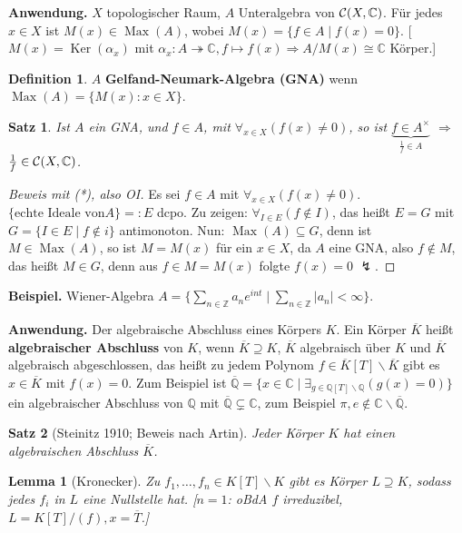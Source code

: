 \documentclass[headsepline=true,DIV=11]{scrartcl}
\newtheorem*{theorem}{Satz}
\newtheorem*{lemma}{Lemma}
\theoremstyle{definition}
\newtheorem*{definition}{Definition}
\renewcommand{\bar}[1]{\overline{#1}}
\newcommand{\Max}{\operatorname{Max}}
\newcommand{\Ker}{\operatorname{Ker}}
\begin{document}
{\bf Anwendung.} $X$ topologischer Raum, $A$ Unteralgebra von ${\cal C}(X,\mathbb{C})$. Für jedes $x\in X$ ist $M(x)\in\Max(A)$, wobei $M(x)=\{f\in
A\mid f(x)=0\}$. [$M(x)=\Ker(\alpha_x)$ mit $\alpha_x:A\twoheadrightarrow\mathbb{C},f\mapsto f(x)\Rightarrow A/M(x)\cong\mathbb{C}$ Körper.]

\begin{definition}
  $A$ {\bf Gelfand-Neumark-Algebra (GNA)} wenn $\Max(A)=\{M(x):x\in X\}$.
\end{definition}

\begin{theorem}
  Ist $A$ ein GNA, und $f\in A$, mit $\forall_{x\in X}(f(x)\neq 0)$, so ist $\underbrace{f\in A^\times}_{\frac{1}{f}\in A}$ $\Rightarrow$
  $\frac{1}{f}\in{\cal C}(X,\mathbb{C})$.
\end{theorem}

\begin{proof}[Beweis mit (*), also OI]
  Es sei $f\in A$ mit $\forall_{x\in X}(f(x)\neq 0)$. $\{\mbox{echte Ideale von} A\}=:E$ dcpo. Zu zeigen: $\forall_{I\in E}(f\not\in I)$, das heißt
  $E=G$ mit $G=\{I\in E\mid f\not\in i\}$ antimonoton. Nun: $\Max(A)\subseteq G$, denn ist $M\in\Max(A)$, so ist $M=M(x)$ für ein $x\in X$, da $A$
  eine GNA, also $f\not\in M$, das heißt $M\in G$, denn aus $f\in M=M(x)$ folgte $f(x)=0$ $\lightning$.
\end{proof}

{\bf Beispiel.} Wiener-Algebra $A=\{\sum\limits_{n\in\mathbb{Z}} a_ne^{int}\mid\sum\limits_{n\in\mathbb{Z}}|a_n|<\infty\}$.

{\bf Anwendung.} Der algebraische Abschluss eines Körpers $K$. Ein Körper $\bar{K}$ heißt {\bf algebraischer Abschluss} von $K$, wenn
$\bar{K}\supseteq K$, $\bar{K}$ algebraisch über $K$ und $\bar{K}$ algebraisch abgeschlossen, das heißt zu jedem Polynom
$f\in\bar{K}[T]\backslash\bar{K}$ gibt es $x\in\bar{K}$ mit $f(x)=0$. Zum Beispiel ist
$\bar{\mathbb{Q}}=\{x\in\mathbb{C}\mid\exists_{g\in\mathbb{Q}[T]\backslash\mathbb{Q}}(g(x)=0)\}$ ein algebraischer Abschluss von $\mathbb{Q}$ mit
$\bar{\mathbb{Q}}\subsetneq\mathbb{C}$, zum Beispiel $\pi, e\not\in\mathbb{C}\backslash\bar{\mathbb{Q}}$.

\begin{theorem}[Steinitz 1910; Beweis nach Artin]
  Jeder Körper $K$ hat einen algebraischen Abschluss $\bar{K}$.
\end{theorem}

\begin{lemma}[Kronecker]
  Zu $f_1,\ldots,f_n\in K[T]\backslash K$ gibt es Körper $L\supseteq K$, sodass jedes $f_i$ in $L$ eine Nullstelle hat. [$n=1$: oBdA $f$ irreduzibel,
    $L=K[T]/(f), x=\bar{T}$.]
\end{lemma}
\end{document}
